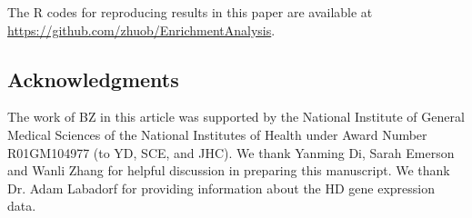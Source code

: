 	The R codes for reproducing results in this paper are available at
	\url{https://github.com/zhuob/EnrichmentAnalysis}.
	
	
	
		
	\subsection*{Acknowledgments}\label{section:acknowledgment}
	The work of BZ in this article was supported by the National Institute of 
	General Medical Sciences of the National Institutes of Health under Award Number R01GM104977 
	(to YD, SCE, and JHC). We thank Yanming Di, Sarah Emerson and Wanli Zhang for helpful 
	discussion in preparing this manuscript. We thank Dr. Adam Labadorf for providing information 
	about the HD gene expression data. %
	
	
	
	\newpage

